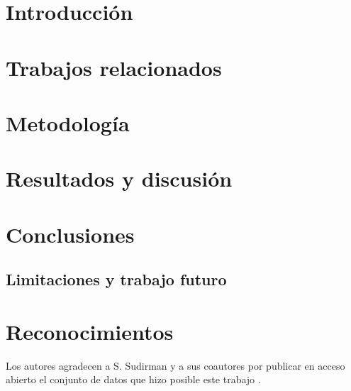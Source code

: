 \documentclass[conference,letterpaper]{IEEEtran}
\begin{document}
\section{Introducción}


\section{Trabajos relacionados}
\label{sec:relacionados}


\section{Metodología}
\label{sec:metodologia}



\section{Resultados y discusión}
\label{sec:resultados}


\section{Conclusiones}
\label{sec:conclusiones}


\subsection{Limitaciones y trabajo futuro}


\section*{Reconocimientos}
Los autores agradecen a S. Sudirman y a sus coautores por publicar en acceso abierto el conjunto de datos que hizo posible este trabajo \cite{sudirman2019}.



\end{document}
